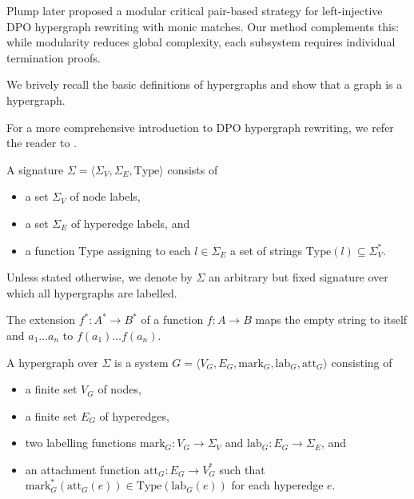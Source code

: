 Plump \cite{plump2018modular} later proposed a modular critical pair-based strategy for left-injective DPO hypergraph rewriting with monic matches. 
Our method complements this: while modularity reduces global complexity, each subsystem requires individual termination proofs. 

We brively recall the basic definitions of hypergraphs and show that a graph is a hypergraph.

 For a more comprehensive introduction to DPO hypergraph rewriting, we refer the reader to \cite{plump2018modular}. 

\begin{definition}
    A signature $\Sigma \mathop{=} \langle \Sigma_V, \Sigma_E, \text{Type} \rangle$ consists of 
    \begin{itemize}
        \item a set $\Sigma_V$ of node labels,
        \item a set $\Sigma_E$ of hyperedge labels, and
        \item a function $\text{Type}$ assigning to each $l \mathop{\in} \Sigma_E$ a set of strings $\text{Type}(l) \mathop{\subseteq} \Sigma_V^*$.
    \end{itemize}
\end{definition}
Unless stated otherwise, we denote by $\Sigma$ an arbitrary but fixed signature over which all hypergraphs are labelled.

\begin{remark}
    The extension $f^* : A^* \mathop{\to} B^*$ of a function $f : A \mathop{\to} B$ maps the empty string to itself and $a_1 \ldots a_n$ to $f(a_1) \ldots f(a_n)$.
\end{remark}
\begin{definition}
    A hypergraph over $\Sigma$ is a system $G \mathop{=} \langle V_G, E_G, \text{mark}_G, \text{lab}_G, \text{att}_G \rangle$ consisting of 
    \begin{itemize}
        \item a finite set $V_G$ of nodes,
        \item a finite set $E_G$ of hyperedges,
        \item two labelling functions $\text{mark}_G : V_G \mathop{\to} \Sigma_V$ and $\text{lab}_G : E_G \mathop{\to} \Sigma_E$, and
        \item an attachment function $\text{att}_G : E_G \mathop{\to} V_G^*$ such that $\text{mark}_G^*(\text{att}_G(e)) \mathop{\in} \text{Type}(\text{lab}_G(e))$ for each hyperedge $e$.
    \end{itemize} 
\end{definition} 

